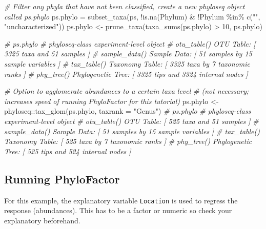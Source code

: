 \documentclass[
]{book}
\newenvironment{Shaded}{\begin{snugshade}}{\end{snugshade}}
\newcommand{\AttributeTok}[1]{\textcolor[rgb]{0.77,0.63,0.00}{#1}}
\newcommand{\CommentTok}[1]{\textcolor[rgb]{0.56,0.35,0.01}{\textit{#1}}}
\newcommand{\DecValTok}[1]{\textcolor[rgb]{0.00,0.00,0.81}{#1}}
\newcommand{\FunctionTok}[1]{\textcolor[rgb]{0.00,0.00,0.00}{#1}}
\newcommand{\NormalTok}[1]{#1}
\newcommand{\OtherTok}[1]{\textcolor[rgb]{0.56,0.35,0.01}{#1}}
\newcommand{\SpecialCharTok}[1]{\textcolor[rgb]{0.00,0.00,0.00}{#1}}
\newcommand{\StringTok}[1]{\textcolor[rgb]{0.31,0.60,0.02}{#1}}
\begin{document}
\begin{Shaded}
\begin{Highlighting}[]
\CommentTok{\# Filter any phyla that have not been classified, create a new phyloseq object called ps.phylo}
\NormalTok{ps.phylo }\OtherTok{=} \FunctionTok{subset\_taxa}\NormalTok{(ps, }\SpecialCharTok{!}\FunctionTok{is.na}\NormalTok{(Phylum) }\SpecialCharTok{\&} \SpecialCharTok{!}\NormalTok{Phylum }\SpecialCharTok{\%in\%} \FunctionTok{c}\NormalTok{(}\StringTok{""}\NormalTok{, }\StringTok{"uncharacterized"}\NormalTok{))}
\NormalTok{ps.phylo }\OtherTok{\textless{}{-}} \FunctionTok{prune\_taxa}\NormalTok{(}\FunctionTok{taxa\_sums}\NormalTok{(ps.phylo)  }\SpecialCharTok{\textgreater{}} \DecValTok{10}\NormalTok{, ps.phylo)}

\CommentTok{\# ps.phylo }
\CommentTok{\# phyloseq{-}class experiment{-}level object}
\CommentTok{\# otu\_table()   OTU Table:         [ 3325 taxa and 51 samples ]}
\CommentTok{\# sample\_data() Sample Data:       [ 51 samples by 15 sample variables ]}
\CommentTok{\# tax\_table()   Taxonomy Table:    [ 3325 taxa by 7 taxonomic ranks ]}
\CommentTok{\# phy\_tree()    Phylogenetic Tree: [ 3325 tips and 3324 internal nodes ]}

\CommentTok{\# Option to agglomerate abundances to a certain taxa level }
\CommentTok{\# (not necessary; increases speed of running PhyloFactor for this tutorial)}
\NormalTok{ps.phylo }\OtherTok{\textless{}{-}}\NormalTok{ phyloseq}\SpecialCharTok{::}\FunctionTok{tax\_glom}\NormalTok{(ps.phylo, }\AttributeTok{taxrank =} \StringTok{"Genus"}\NormalTok{)  }
\CommentTok{\# ps.phylo  }
\CommentTok{\# phyloseq{-}class experiment{-}level object}
\CommentTok{\# otu\_table()   OTU Table:         [ 525 taxa and 51 samples ]}
\CommentTok{\# sample\_data() Sample Data:       [ 51 samples by 15 sample variables ]}
\CommentTok{\# tax\_table()   Taxonomy Table:    [ 525 taxa by 7 taxonomic ranks ]}
\CommentTok{\# phy\_tree()    Phylogenetic Tree: [ 525 tips and 524 internal nodes ]}
\end{Highlighting}
\end{Shaded}

\hypertarget{running-phylofactor}{%
\subsection{Running PhyloFactor}\label{running-phylofactor}}

For this example, the explanatory variable \texttt{Location} is used to regress the response (abundances). This has to be a factor or numeric so check your explanatory beforehand.
\end{document}
